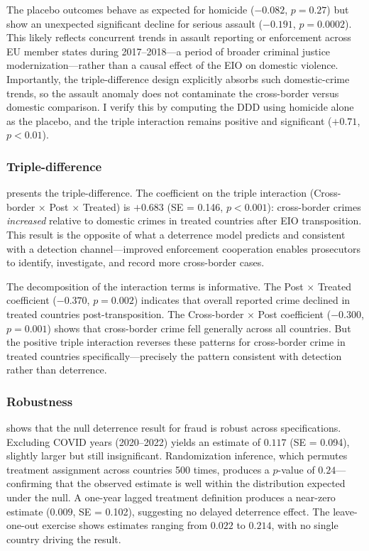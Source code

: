 \documentclass[12pt]{article}
\begin{document}
The placebo outcomes behave as expected for homicide ($-0.082$, $p = 0.27$) but show an unexpected significant decline for serious assault ($-0.191$, $p = 0.0002$). This likely reflects concurrent trends in assault reporting or enforcement across EU member states during 2017--2018---a period of broader criminal justice modernization---rather than a causal effect of the EIO on domestic violence. Importantly, the triple-difference design explicitly absorbs such domestic-crime trends, so the assault anomaly does not contaminate the cross-border versus domestic comparison. I verify this by computing the DDD using homicide alone as the placebo, and the triple interaction remains positive and significant ($+0.71$, $p < 0.01$).



\subsubsection*{Triple-difference}   presents the triple-difference. The coefficient on the triple interaction (Cross-border $\times$ Post $\times$ Treated) is $+0.683$ (SE = 0.146, $p < 0.001$): cross-border crimes \textit{increased} relative to domestic crimes in treated countries after EIO transposition. This result is the opposite of what a deterrence model predicts and consistent with a detection channel---improved enforcement cooperation enables prosecutors to identify, investigate, and record more cross-border cases.

The decomposition of the interaction terms is informative. The Post $\times$ Treated coefficient ($-0.370$, $p = 0.002$) indicates that overall reported crime declined in treated countries post-transposition. The Cross-border $\times$ Post coefficient ($-0.300$, $p = 0.001$) shows that cross-border crime fell generally across all countries. But the positive triple interaction reverses these patterns for cross-border crime in treated countries specifically---precisely the pattern consistent with detection rather than deterrence.



\subsubsection*{Robustness}   shows that the null deterrence result for fraud is robust across specifications. Excluding COVID years (2020--2022) yields an estimate of $0.117$ (SE = 0.094), slightly larger but still insignificant. Randomization inference, which permutes treatment assignment across countries 500 times, produces a $p$-value of $0.24$---confirming that the observed estimate is well within the distribution expected under the null. A one-year lagged treatment definition produces a near-zero estimate ($0.009$, SE = 0.102), suggesting no delayed deterrence effect. The leave-one-out exercise shows estimates ranging from $0.022$ to $0.214$, with no single country driving the result.
\end{document}
